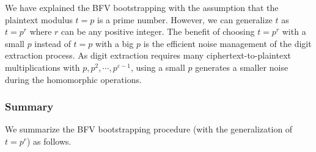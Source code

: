$ $

 We have explained the BFV bootstrapping with the assumption that the plaintext modulus $t = p$ is a prime number. However, we can generalize $t$ as $t=p^r$ where $r$ can be any positive integer. The benefit of choosing $t = p^r$ with a small $p$ instead of $t = p$ with a big $p$ is the efficient noise management of the digit extraction process. As digit extraction requires many ciphertext-to-plaintext multiplications with $p, p^2, \cdots, p^{\varepsilon-1}$, using a small $p$ generates a smaller noise during the homomorphic operations.  


\subsubsection{Summary}
\label{subsubsec:bfv-bootstrapping-summary}

We summarize the BFV bootstrapping procedure (with the generalization of $t = p^r$) as follows. 

